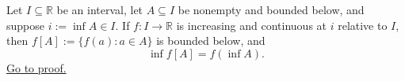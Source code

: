 \begin{theorem}
\label{thm:increasing-image-preserves-infima}
Let $I\subseteq\mathbb{R}$ be an interval, let $A\subseteq I$ be nonempty and
bounded below, and suppose $i:=\inf A\in I$.  If $f\colon I\to\mathbb{R}$ is
increasing and continuous at $i$ relative to $I$, then
$f[A]:=\{f(a):a\in A\}$ is bounded below, and
\[
  \inf f[A]=f(\inf A).
\]
\hyperref[prf:increasing-image-preserves-infima]{Go to proof.}
\end{theorem}